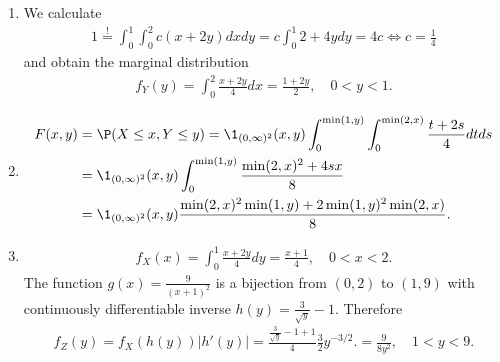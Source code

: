\begin{solution}

\phantom{}

\begin{enumerate}[label = (\alph*)]
  \item We calculate
  \begin{align*}
    1 \stackrel{!}{=} \int_0^1\int_0^2 c(x + 2y) dx dy = c\int_0^1 2 + 4y dy = 4c
    \iff c = \frac{1}{4}
  \end{align*}
  and obtain the marginal distribution
  \begin{align*}
    f_Y(y) = \int_0^2 \frac{x + 2y}{4} dx = \frac{1 + 2y}{2}, \quad 0 < y < 1.
  \end{align*}
  \item
  \begin{align*}
    F(x,y) &= \P(X \leq x, Y \leq y) = \1_{(0,\infty)^2}(x,y)\int_0^{\min(1,y)}
    \int_0^{\min(2,x)} \frac{t+2s}{4} dt ds \\
    &= \1_{(0,\infty)^2}(x,y)\int_0^{\min(1,y)} \frac{\min(2,x)^2 + 4sx}{8} \\
    &= \1_{(0,\infty)^2}(x,y)\frac{\min(2,x)^2\min(1,y) + 2\min(1,y)^2\min(2,x)}{8}.
  \end{align*}
  \item
  \begin{align*}
    f_X(x) = \int_0^1 \frac{x + 2y}{4} dy = \frac{x + 1}{4}, \quad 0 < x < 2.
  \end{align*}
  The function $g(x) = \frac{9}{(x+1)^2}$ is a bijection from $(0,2)$ to $(1,9)$
  with continuously differentiable inverse $h(y) = \frac{3}{\sqrt{y}} - 1$.
  Therefore
  \begin{align*}
    f_Z(y) = f_X(h(y))|h'(y)| = \frac{\frac{3}{\sqrt{y}} - 1 + 1}{4}\frac{3}{2}y^{-3/2}.
    = \frac{9}{8y^2}, \quad 1 < y < 9.
  \end{align*}
\end{enumerate}

\end{solution}

